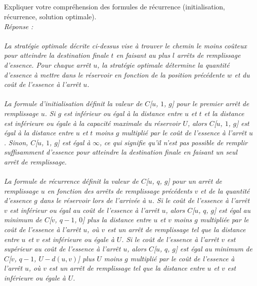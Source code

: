\documentclass[a4paper,11pt]{article}
\begin{document}
	\subsection{}\label{subsec:Q9}
        Expliquer votre compréhension des formules de récurrence (initialisation, récurrence, solution optimale). 
            \\\textit{Réponse : \\\\  
            La stratégie optimale décrite ci-dessus vise à trouver le chemin le moins coûteux pour atteindre la destination finale $t$ en faisant au plus $l$ arrêts de remplissage d'essence. Pour chaque arrêt $u$, la stratégie optimale détermine la quantité d'essence à mettre dans le réservoir en fonction de la position précédente $w$ et du coût de l'essence à l'arrêt $u$.\\\\
La formule d'initialisation définit la valeur de $C$[$u$, $1$, $g$] pour le premier arrêt de remplissage $u$. Si $g$ est inférieur ou égal à la distance entre $u$ et $t$ et la distance est inférieure ou égale à la capacité maximale du réservoir $U$, alors $C$[$u$, $1$, $g$] est égal à la distance entre $u$ et $t$ moins $g$ multiplié par le coût de l'essence à l'arrêt $u$. Sinon, $C$[$u$, $1$, $g$] est égal à $\infty$, ce qui signifie qu'il n'est pas possible de remplir suffisamment d'essence pour atteindre la destination finale en faisant un seul arrêt de remplissage.\\\\
La formule de récurrence définit la valeur de $C$[$u$, $q$, $g$] pour un arrêt de remplissage $u$ en fonction des arrêts de remplissage précédents $v$ et de la quantité d'essence $g$ dans le réservoir lors de l'arrivée à $u$. Si le coût de l'essence à l'arrêt $v$ est inférieur ou égal au coût de l'essence à l'arrêt $u$, alors $C$[$u$, $q$, $g$] est égal au minimum de $C$[$v$, $q-1$, $0$] plus la distance entre $u$ et $v$ moins $g$ multipliée par le coût de l'essence à l'arrêt $u$, où $v$ est un arrêt de remplissage tel que la distance entre $u$ et $v$ est inférieure ou égale à $U$. Si le coût de l'essence à l'arrêt $v$ est supérieur au coût de l'essence à l'arrêt $u$, alors $C$[$u$, $q$, $g$] est égal au minimum de $C$[$v$, $q-1$, $U-d(u,v)$] plus $U$ moins $g$ multiplié par le coût de l'essence à l'arrêt $u$, où $v$ est un arrêt de remplissage tel que la distance entre $u$ et $v$ est inférieure ou égale à $U$.\\\\
}
\end{document}

